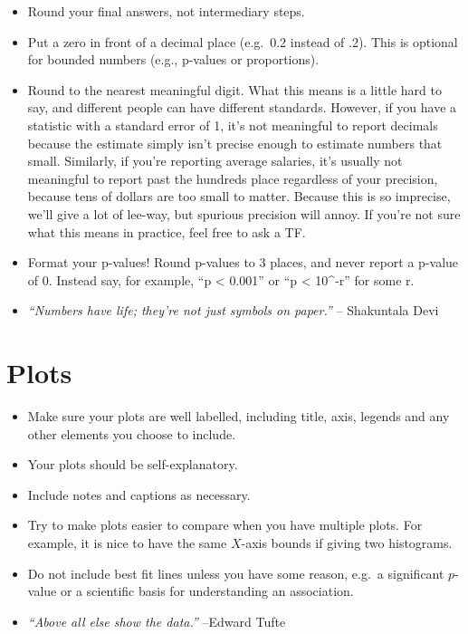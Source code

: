 \documentclass[
  letterpaper,
  DIV=11,
  numbers=noendperiod]{scrreprt}
\providecommand{\tightlist}{%
  \setlength{\itemsep}{0pt}\setlength{\parskip}{0pt}}\usepackage{longtable,booktabs,array}
\begin{document}
\begin{itemize}
\tightlist
\item
  Round your final answers, not intermediary steps.
\item
  Put a zero in front of a decimal place (e.g.~0.2 instead of .2). This
  is optional for bounded numbers (e.g., p-values or proportions).
\item
  Round to the nearest meaningful digit. What this means is a little
  hard to say, and different people can have different standards.
  However, if you have a statistic with a standard error of 1, it's not
  meaningful to report decimals because the estimate simply isn't
  precise enough to estimate numbers that small. Similarly, if you're
  reporting average salaries, it's usually not meaningful to report past
  the hundreds place regardless of your precision, because tens of
  dollars are too small to matter. Because this is so imprecise, we'll
  give a lot of lee-way, but spurious precision will annoy. If you're
  not sure what this means in practice, feel free to ask a TF.
\item
  Format your p-values! Round p-values to 3 places, and never report a
  p-value of 0. Instead say, for example, ``p \textless{} 0.001'' or ``p
  \textless{} 10\^{}-r'' for some r.
\item
  \emph{``Numbers have life; they're not just symbols on paper.''} --
  Shakuntala Devi
\end{itemize}

\hypertarget{plots}{%
\section*{Plots}\label{plots}}


\begin{itemize}
\tightlist
\item
  Make sure your plots are well labelled, including title, axis, legends
  and any other elements you choose to include.
\item
  Your plots should be self-explanatory.
\item
  Include notes and captions as necessary.
\item
  Try to make plots easier to compare when you have multiple plots. For
  example, it is nice to have the same \(X\)-axis bounds if giving two
  histograms.
\item
  Do not include best fit lines unless you have some reason, e.g.~a
  significant \(p\)-value or a scientific basis for understanding an
  association.
\item
  \emph{``Above all else show the data.''} --Edward Tufte
\end{itemize}
\end{document}

